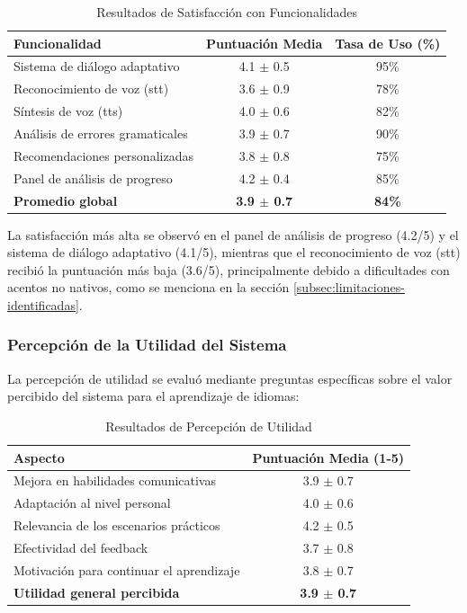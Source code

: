 \begin{table}[h]
\centering
\caption{Resultados de Satisfacción con Funcionalidades}
\label{table:satisfaccion_funcionalidades}
\begin{tabular}{|l|c|c|}
\hline
\textbf{Funcionalidad} & \textbf{Puntuación Media} & \textbf{Tasa de Uso (\%)} \\
\hline
Sistema de diálogo adaptativo & 4.1 $\pm$ 0.5 & 95\% \\
\hline
Reconocimiento de voz (\gls{stt}) & 3.6 $\pm$ 0.9 & 78\% \\
\hline
Síntesis de voz (\gls{tts}) & 4.0 $\pm$ 0.6 & 82\% \\
\hline
Análisis de errores gramaticales & 3.9 $\pm$ 0.7 & 90\% \\
\hline
Recomendaciones personalizadas & 3.8 $\pm$ 0.8 & 75\% \\
\hline
Panel de análisis de progreso & 4.2 $\pm$ 0.4 & 85\% \\
\hline
\textbf{Promedio global} & \textbf{3.9 $\pm$ 0.7} & \textbf{84\%} \\
\hline
\end{tabular}
\end{table}

La satisfacción más alta se observó en el panel de análisis de progreso (4.2/5) y el sistema de diálogo adaptativo (4.1/5), mientras que el reconocimiento de voz (\gls{stt}) recibió la puntuación más baja (3.6/5), principalmente debido a dificultades con acentos no nativos, como se menciona en la sección \ref{subsec:limitaciones-identificadas}.


\subsubsection{Percepción de la Utilidad del Sistema}
\label{subsubsec:percepcion_utilidad}

La percepción de utilidad se evaluó mediante preguntas específicas sobre el valor percibido del sistema para el aprendizaje de idiomas: 

\begin{table}[h]
\centering
\caption{Resultados de Percepción de Utilidad}
\label{table:percepcion_utilidad}
\begin{tabular}{|l|c|}
\hline
\textbf{Aspecto} & \textbf{Puntuación Media (1-5)} \\
\hline
Mejora en habilidades comunicativas & 3.9 $\pm$ 0.7 \\
\hline
Adaptación al nivel personal & 4.0 $\pm$ 0.6 \\
\hline
Relevancia de los escenarios prácticos & 4.2 $\pm$ 0.5 \\
\hline
Efectividad del feedback & 3.7 $\pm$ 0.8 \\
\hline
Motivación para continuar el aprendizaje & 3.8 $\pm$ 0.7 \\
\hline
\textbf{Utilidad general percibida} & \textbf{3.9 $\pm$ 0.7} \\
\hline
\end{tabular}
\end{table}

